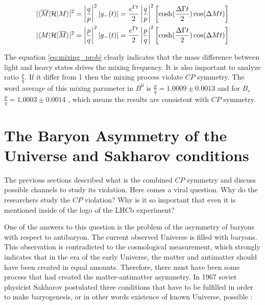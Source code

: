 \begin{align}
\label{eq:mixing_prob}
|\langle\overline{M}\rvert \mathcal{H} \lvert M\rangle|^{2} = \left|\frac{q}{p}\right|^{2} |g_{-}(t)| = \frac{e^{\Gamma t}}{2} \left|\frac{q}{p}\right|^{2}  \left[ \cosh(\frac{\Delta \Gamma t}{2})\cos(\Delta M t) \right] \\ 
|\langle M\rvert \mathcal{H} \lvert\overline{M}\rangle|^{2} = \left|\frac{p}{q}\right|^{2} |g_{-}(t)| = \frac{e^{\Gamma t}}{2} \left|\frac{p}{q}\right|^{2}  \left[ \cosh(\frac{\Delta \Gamma t}{2})\cos(\Delta M t) \right]
\end{align}

The equation \ref{eq:mixing_prob} clearly indicates that the mass difference between light and heavy states drives the mixing frequency. It is also important to analyze ratio $\frac{p}{q}$. If it differ from 1 then the mixing process violate $CP$ symmetry. The word average of this mixing parameter in $B^{0}$ is  $\frac{p}{q} = 1.0009 \pm 0.0013$ and  for $B_s$  $\frac{p}{q} = 1.0003 \pm 0.0014$ \cite{PDG}, which means the results are consistent with $CP$ symmetry. 

\section{The Baryon Asymmetry of the Universe and Sakharov conditions}

The previous sections described what is the combined $CP$ symmetry and discuss possible channels to study its violation. Here comes a viral question. Why do the researchers study the $CP$ violation? Why is it so important that even it is mentioned inside of the logo of the LHCb experiment? 

One of the answers to this question is the problem of the asymmetry of baryons with respect to antibaryon. The current observed Universe is filled with baryons.  This observation is contradicted to the cosmological measurement, which strongly indicates that in the era of the early Universe, the matter and antimatter should have been created in equal amounts. Therefore, there must have been some process that had created the matter-antimatter asymmetry.  
In 1967 soviet physicist Sakharov postulated three conditions that have to be fulfilled in order to make baryogenesis, or in other words existence of known Universe,  possible \cite{sakharov}: 

